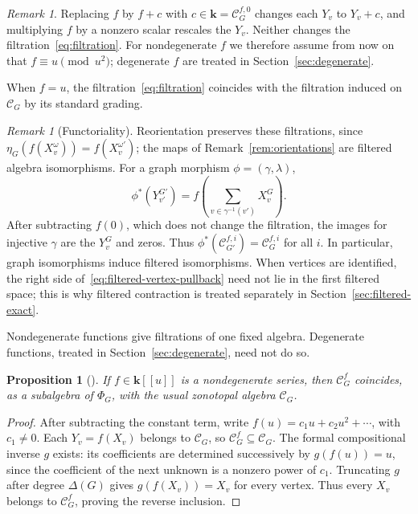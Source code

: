 \documentclass[reqno]{article}
\theoremstyle{plain} %
\newtheorem{proposition}[theorem]{Proposition}
\theoremstyle{definition}
\theoremstyle{remark}
\newtheorem{remark}[theorem]{\sc Remark}
\newcommand{\K} {\mathbf{k}}
\newcommand {\CC}{\mathscr{C}}
\numberwithin{equation}{section}
\begin{document}
\begin{remark}
\label{rem:const}
Replacing $f$ by $f+c$ with $c\in\K=\CC^{f,0}_G$ changes each $Y_v$ to
$Y_v+c$, and multiplying $f$ by a nonzero scalar rescales the $Y_v$.
Neither changes the filtration~\eqref{eq:filtration}. For nondegenerate
$f$ we therefore assume from now on that $f\equiv u\pmod{u^2}$;
degenerate $f$ are treated in Section~\ref{sec:degenerate}.
\end{remark}

When $f = u$, the filtration~\eqref{eq:filtration} coincides with the filtration induced on  $\CC_G$ by its standard grading.

\begin{remark}[Functoriality]\label{rem:filtered-functoriality}
Reorientation preserves these filtrations, since
$\eta_G(f(X_v^\omega))=f(X_v^{\omega'})$; the maps of
Remark~\ref{rem:orientations} are filtered algebra isomorphisms.
For a graph morphism $\phi=(\gamma,\lambda)$,
\begin{equation}\label{eq:filtered-vertex-pullback}
\phi^*(Y_{v'}^{G'})=
 f\left(\sum_{v\in\gamma^{-1}(v')}X_v^G\right).
\end{equation}
After subtracting $f(0)$, which does not change the filtration, the
images for injective $\gamma$ are the $Y_v^G$ and zeros. Thus
$\phi^*(\CC_{G'}^{f,i})=\CC_G^{f,i}$ for all $i$. In particular, graph
isomorphisms induce filtered isomorphisms. When vertices are identified,
the right side of~\eqref{eq:filtered-vertex-pullback} need not lie in
the first filtered space; this is why filtered contraction is treated
separately in Section~\ref{sec:filtered-exact}.
\end{remark}


Nondegenerate functions give filtrations of one fixed algebra. Degenerate
functions, treated in Section~\ref{sec:degenerate}, need not do so.

\begin{proposition}[{\cite[Proposition~2]{NSh}}]
\label{prop:same-algebra}
If $f\in \K[[u]]$ is a nondegenerate series, then $\CC^f_G$  coincides, as a subalgebra of $\Phi_G$, with the usual zonotopal algebra $\CC_G$.
\end{proposition}


\begin{proof}
After subtracting the constant term, write
$f(u)=c_1u+c_2u^2+\cdots$, with $c_1\ne0$. Each $Y_v=f(X_v)$ belongs
to $\CC_G$, so $\CC_G^f\subseteq\CC_G$. The formal compositional
inverse $g$ exists: its coefficients are determined successively by
$g(f(u))=u$, since the coefficient of the next unknown is a nonzero
power of $c_1$. Truncating $g$ after degree $\Delta(G)$ gives
$g(f(X_v))=X_v$ for every vertex. Thus every $X_v$ belongs to
$\CC_G^f$, proving the reverse inclusion.
\end{proof}
\end{document}
